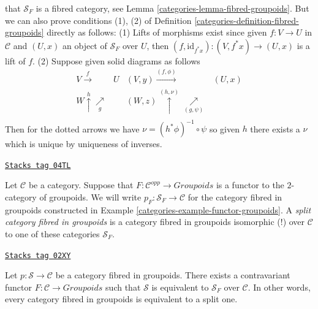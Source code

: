 \begin{example}
that $\mathcal{S}_F$ is a fibred category, see
Lemma \ref{categories-lemma-fibred-groupoids}.
But we can also prove conditions (1), (2) of
Definition \ref{categories-definition-fibred-groupoids}
directly as follows: (1) Lifts of
morphisms exist since given $f: V \to U$ in $\mathcal{C}$ and $(U, x)$
an object of $\mathcal{S}_F$ over $U$, then
$(f, \text{id}_{f^\ast x}): (V, {f^\ast x}) \to (U, x)$ is a lift of $f$.
(2) Suppose given solid diagrams as follows
$$
\begin{array}{cccc}V \overset{f}{\longrightarrow} & U & (V, y) \overset{(f, \phi)}{\longrightarrow} & (U, x) \\ W \overset{h}{\uparrow}\underset{g}{\nearrow} &  & (W, z) \overset{(h, \nu)}{\uparrow}\underset{(g, \psi)}{\nearrow} &  \\  &  &  & \end{array}
$$
Then for the dotted arrows we have $\nu = (h^\ast \phi)^{-1} \circ \psi$
so given $h$ there exists a $\nu$ which is unique by uniqueness of inverses.
\end{example}

\begin{definition}
\label{categories-definition-split-category-fibred-in-groupoids}
\href{https://stacks.math.columbia.edu/tag/04TL}{\texttt{Stacks tag 04TL}}

Let $\mathcal{C}$ be a category.
Suppose that $F : \mathcal{C}^{opp} \to \textit{Groupoids}$ is a functor
to the $2$-category of groupoids.
We will write $p_F : \mathcal{S}_F \to \mathcal{C}$ for the
category fibred in groupoids constructed in
Example \ref{categories-example-functor-groupoids}.
A {\it split category fibred in groupoids} is a
category fibred in groupoids isomorphic (!)
over $\mathcal{C}$ to one of these categories {\it $\mathcal{S}_F$}.
\end{definition}

\begin{lemma}
\label{categories-lemma-fibred-groupoids-strict}
\href{https://stacks.math.columbia.edu/tag/02XY}{\texttt{Stacks tag 02XY}}

Let $ p : \mathcal{S} \to \mathcal{C}$ be a category fibred in groupoids.
There exists a contravariant functor $F : \mathcal{C} \to \textit{Groupoids}$
such that $\mathcal{S}$ is equivalent to $\mathcal{S}_F$ over $\mathcal{C}$.
In other words, every category fibred in groupoids is equivalent to a split one.
\end{lemma}

